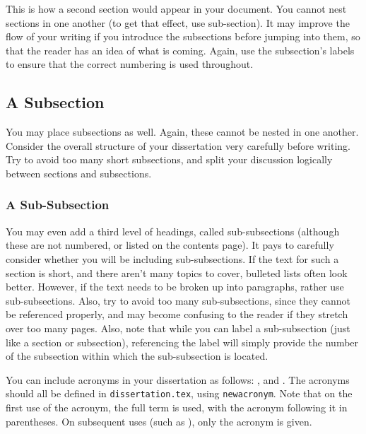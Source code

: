 This is how a second section would appear in your document. You cannot nest sections in one another (to get that effect, use sub-section). It may improve the flow of your writing if you introduce the subsections before jumping into them, so that the reader has an idea of what is coming. Again, use the subsection's labels to ensure that the correct numbering is used throughout.


\subsection{A Subsection}
\label{sec:first:second_sec:sub}

You may place subsections as well. Again, these cannot be nested in one another. Consider the overall structure of your dissertation very carefully before writing. Try to avoid too many short subsections, and split your discussion logically between sections and subsections.

\subsubsection{A Sub-Subsection}
\label{sec:first:second_sec:sub:subsub}

You may even add a third level of headings, called sub-subsections (although these are not numbered, or listed on the contents page). It pays to carefully consider whether you will be including sub-subsections. If the text for such a section is short, and there aren't many topics to cover, bulleted lists often look better. However, if the text needs to be broken up into paragraphs, rather use sub-subsections. Also, try to avoid too many sub-subsections, since they cannot be referenced properly, and may become confusing to the reader if they stretch over too many pages. Also, note that while you can label a sub-subsection (just like a section or subsection), referencing the label will simply provide the number of the subsection within which the sub-subsection is located.

You can include acronyms in your dissertation as follows: ,  and . The acronyms should all be defined in \texttt{dissertation.tex}, using \texttt{newacronym}. Note that on the first use of the acronym, the full term is used, with the acronym following it in parentheses. On subsequent uses (such as ), only the acronym is given.

